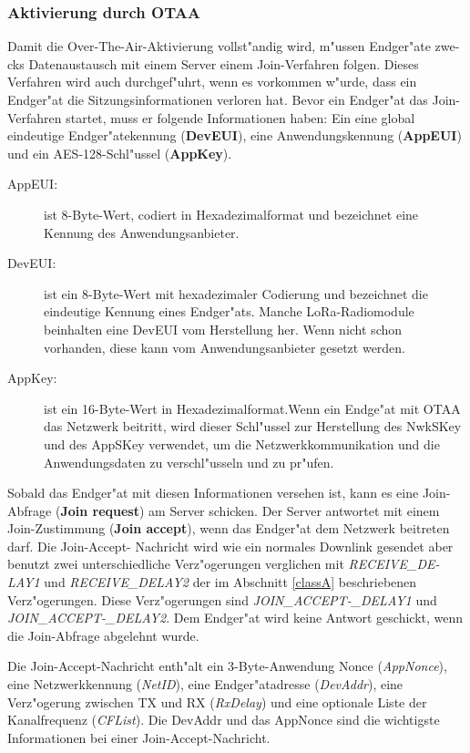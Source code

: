 \subsubsection{Aktivierung durch OTAA}
Damit die Over-The-Air-Aktivierung vollst"andig wird, m"ussen 
Endger"ate zwe-cks Datenaustausch mit einem Server einem Join-Verfahren 
folgen. Dieses Verfahren wird auch durchgef"uhrt, wenn es vorkommen 
w"urde, dass ein Endger"at die Sitzungsinformationen verloren hat.
Bevor ein Endger"at das Join-Verfahren startet, muss er folgende 
Informationen haben: Ein eine global eindeutige Endger"atekennung 
(\textbf{DevEUI}), eine Anwendungskennung (\textbf{AppEUI}) und ein 
AES-128-Schl"ussel (\textbf{AppKey}). 


\begin{description}
	\item[AppEUI:] ist 8-Byte-Wert, codiert in Hexadezimalformat und 
	bezeichnet eine Kennung des Anwendungsanbieter.
	\item[DevEUI:] ist ein 8-Byte-Wert mit hexadezimaler Codierung und 
	bezeichnet die eindeutige Kennung eines Endger"ats. Manche 
	LoRa-Radiomodule beinhalten eine DevEUI vom Herstellung her. Wenn 
	nicht schon vorhanden, diese kann vom Anwendungsanbieter gesetzt 
	werden.
	\item[AppKey:] ist ein 16-Byte-Wert in Hexadezimalformat.Wenn ein 
	Endge"at mit OTAA das Netzwerk beitritt, wird dieser Schl"ussel zur 
	Herstellung des NwkSKey und des AppSKey verwendet, um die 
	Netzwerkkommunikation und die Anwendungsdaten zu verschl"usseln und 
	zu pr"ufen. 
\end{description}

Sobald das Endger"at mit diesen Informationen versehen ist, kann es eine 
Join-Abfrage (\textbf{Join request}) am Server schicken. Der Server 
antwortet mit einem Join-Zustimmung (\textbf{Join accept}), wenn das 
Endger"at dem Netzwerk beitreten darf. Die Join-Accept- Nachricht wird 
wie ein normales Downlink gesendet aber benutzt zwei unterschiedliche 
Verz"ogerungen verglichen mit \textit{RECEIVE\_DE-LAY1} und 
\textit{RECEIVE\_DELAY2} der im Abschnitt \ref{classA} beschriebenen 
Verz"ogerungen. Diese Verz"ogerungen sind \textit{JOIN\_ACCEPT-\_DELAY1} 
und \textit{JOIN\_ACCEPT-\_DELAY2}. Dem Endger"at wird keine Antwort 
geschickt, wenn die Join-Abfrage abgelehnt wurde.

Die Join-Accept-Nachricht enth"alt ein 3-Byte-Anwendung Nonce 
(\textit{AppNonce}), eine Netzwerkkennung (\textit{NetID}), eine 
Endger"atadresse (\textit{DevAddr}), eine Verz"ogerung zwischen TX und 
RX (\textit{RxDelay}) und eine optionale Liste der Kanalfrequenz 
(\textit{CFList}). Die DevAddr und das AppNonce sind die wichtigste 
Informationen bei einer Join-Accept-Nachricht.


